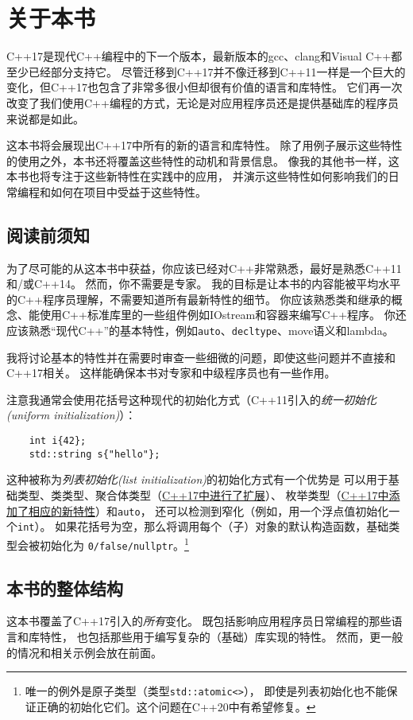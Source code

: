 \chapter{关于本书}
C++17是现代C++编程中的下一个版本，最新版本的gcc、clang和Visual C++都至少已经部分支持它。
尽管迁移到C++17并不像迁移到C++11一样是一个巨大的变化，但C++17也包含了非常多很小但却很有价值的语言和库特性。
它们再一次改变了我们使用C++编程的方式，无论是对应用程序员还是提供基础库的程序员来说都是如此。

这本书将会展现出C++17中所有的新的语言和库特性。
除了用例子展示这些特性的使用之外，本书还将覆盖这些特性的动机和背景信息。
像我的其他书一样，这本书也将专注于这些新特性在实践中的应用，
并演示这些特性如何影响我们的日常编程和如何在项目中受益于这些特性。

\section{阅读前须知}\label{须知}
为了尽可能的从这本书中获益，你应该已经对C++非常熟悉，最好是熟悉C++11和/或C++14。
然而，你不需要是专家。
我的目标是让本书的内容能被平均水平的C++程序员理解，不需要知道所有最新特性的细节。
你应该熟悉类和继承的概念、能使用C++标准库里的一些组件例如IOstream和容器来编写C++程序。
你还应该熟悉“现代C++”的基本特性，例如\texttt{auto}、\texttt{decltype}、move语义和lambda。

我将讨论基本的特性并在需要时审查一些细微的问题，即使这些问题并不直接和C++17相关。
这样能确保本书对专家和中级程序员也有一些作用。

注意我通常会使用花括号这种现代的初始化方式（C++11引入的\emph{统一初始化(uniform initialization)}）：
\begin{lstlisting}
    int i{42};
    std::string s{"hello"};
\end{lstlisting}
这种被称为\emph{列表初始化(list initialization)}的初始化方式有一个优势是
可以用于基础类型、类类型、聚合体类型（\hyperref[ch4]{C++17中进行了扩展}）、
枚举类型（\hyperref[ch8.3]{C++17中添加了相应的新特性}）和\texttt{auto}，
还可以检测到窄化（例如，用一个浮点值初始化一个\texttt{int}）。
如果花括号为空，那么将调用每个（子）对象的默认构造函数，基础类型会被初始化为
\texttt{0/false/nullptr}。\footnote{唯一的例外是原子类型（类型\texttt{std::atomic<>}），
即使是列表初始化也不能保证正确的初始化它们。这个问题在C++20中有希望修复。}

\section{本书的整体结构}
这本书覆盖了C++17引入的\emph{所有}变化。
既包括影响应用程序员日常编程的那些语言和库特性，
也包括那些用于编写复杂的（基础）库实现的特性。
然而，更一般的情况和相关示例会放在前面。

